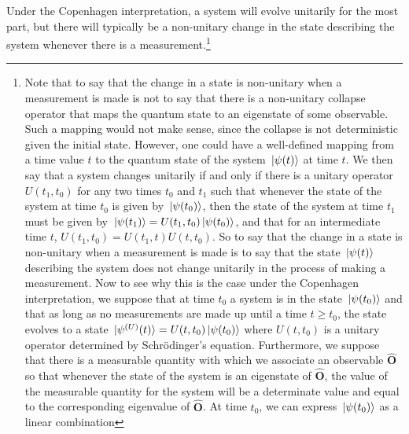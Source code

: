 Under the Copenhagen interpretation, a system will evolve unitarily for the most part, but there will typically be a non-unitary change in the state describing the system whenever there is a measurement.\footnote{Note that to say that the change in a state is non-unitary when a measurement is made is not to say that there is a non-unitary collapse operator that maps the quantum state to an eigenstate of some observable. Such a mapping would not make sense, since the collapse is not deterministic given the initial state. However, one could have a well-defined mapping from a time value $t$ to the quantum state of the system $\ket*{\psi(t)}$ %
%
 at time $t$. We then say that a system changes unitarily if and only if there is a unitary operator $U(t_1,t_0)$ for any two times $t_0$ and $t_1$ such that whenever the state of the system at time $t_0$ is given by $\ket*{\psi(t_0)}$, then the state of the system at time $t_1$ must be given by $\ket*{\psi(t_1)}=U(t_1, t_0)\ket*{\psi(t_0)}$, and that for an intermediate time $t$, $U(t_1,t_0)=U(t_1, t)U(t, t_0).$ So to say that the change in a state is non-unitary when a measurement is made is to say that the state $\ket*{\psi(t)}$ describing the system does not change unitarily in the process of making a measurement. Now to see why this is the case under the Copenhagen interpretation, we suppose that at time $t_0$ a system is in the state $\ket*{\psi(t_0)}$ and that as long as no measurements are made up until a time $t\geq t_0$, the state evolves to a state $\ket*{\psi^{(U)}(t)}=U(t,t_0)\ket*{\psi(t_0)}$  %
%
 where $U(t,t_0)$ is a unitary operator determined by Schr\"{o}dinger's equation. Furthermore, we suppose that there is a measurable quantity with which we associate an observable $\hat{\bm{O}}$ so that whenever the state of the system is an eigenstate of $\hat{\bm{O}}$, the value of the measurable quantity for the system will be a determinate value and equal to the corresponding eigenvalue of $\hat{\bm{O}}$. At time $t_0$, we can express $\ket*{\psi(t_0)}$ as a linear combination
}
